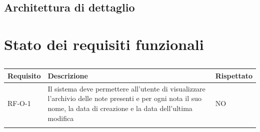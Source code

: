 \documentclass[a4paper,10pt]{article}
\begin{document}
\subsection{Architettura di dettaglio}

\newpage

\section{Stato dei requisiti funzionali}
\begin{center}
    \begin{longtable}{|>{\centering\arraybackslash}m{2.5cm}|>{\centering\arraybackslash}m{8cm}|>{\centering\arraybackslash}m{2.5cm}|}
        \hline
        \textbf{Requisito} & \textbf{Descrizione} & \textbf{Rispettato} \\ \hline
        \endfirsthead
        \hline
        RF-O-1 & Il sistema deve permettere all’utente di visualizzare l’archivio delle note presenti e per ogni nota il suo nome, la data di creazione e la data dell’ultima modifica & NO \\ \hline
        \caption{}
    \end{longtable}
\end{center}
\end{document}
